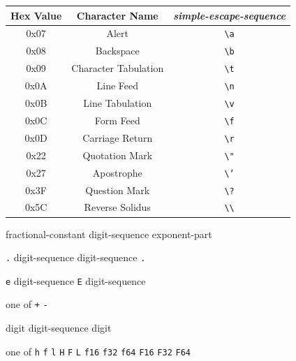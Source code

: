 \begin{center}
  \begin{tabular}{|| c | c | c ||}
    \hline
    Hex Value & Character Name & \textit{simple-escape-sequence} \\
    \hline
    0x07 & Alert & \texttt{\textbackslash a} \\
    0x08 & Backspace & \texttt{\textbackslash b} \\
    0x09 & Character Tabulation & \texttt{\textbackslash t} \\
    0x0A & Line Feed & \texttt{\textbackslash n} \\
    0x0B & Line Tabulation & \texttt{\textbackslash v} \\
    0x0C & Form Feed & \texttt{\textbackslash f} \\
    0x0D & Carriage Return & \texttt{\textbackslash r} \\
    0x22 & Quotation Mark & \texttt{\textbackslash "} \\
    0x27 & Apostrophe & \texttt{\textbackslash '} \\
    0x3F & Question Mark & \texttt{\textbackslash ?} \\
    0x5C & Reverse Solidus & \texttt{\textbackslash\textbackslash} \\
    \hline
  \end{tabular}
\end{center}


\begin{grammar}
  \br
  fractional-constant  \br
  digit-sequence exponent-part 

  \br
   \texttt{.} digit-sequence\br
  digit-sequence \texttt{.}

  \br
  \texttt{e}  digit-sequence\br
  \texttt{E}  digit-sequence

   \textnormal{one of}\br
  \texttt{+} \texttt{-}

  \br
  digit\br
  digit-sequence digit

   \textnormal{one of}\br
  \texttt{h} \texttt{f} \texttt{l}\br
  \texttt{H} \texttt{F} \texttt{L}\br
  \texttt{f16} \texttt{f32} \texttt{f64}\br
  \texttt{F16} \texttt{F32} \texttt{F64}
\end{grammar}

